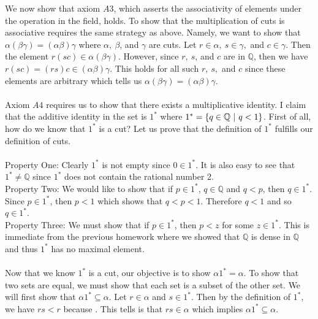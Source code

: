 \documentclass[12pt]{article}
\begin{document}
We now show that axiom $A3$, which asserts the associativity of elements under the operation in the field, holds. To show that the multiplication of cuts is associative requires the same strategy as above. Namely, we want to show that $\alpha (\beta \gamma) = (\alpha \beta)  \gamma$ where $\alpha, ~\beta$, and $\gamma$ are cuts. Let $r \in \alpha,~ s \in \gamma,$ and $c \in \gamma$. Then the element $r(sc) \in \alpha (\beta \gamma)$. However, since $r,~ s$, and $c$ are in $\mathbb{Q}$, then we have $r(sc)=(rs)c \in (\alpha \beta) \gamma$. This holds for all such $r,~s,$ and $c$ since these elements are arbitrary which tells us $\alpha (\beta \gamma) = (\alpha \beta) \gamma$. \\  \\

Axiom $A4$ requires us to show that there exists a multiplicative identity. I claim that the additive identity in the set is $1^{*}$ where $1^{*}= \left\{q \in \mathbb{Q}~|~q<1\right\}$. First of all, how do we know that $1^{*}$ is a cut? Let us prove that the definition of $1^{*}$ fulfills our definition of cuts. \\ \\

Property One: Clearly $1^{*}$ is not empty since $0 \in 1^{*}$. It is also easy to see that $1^{*} \neq \mathbb{Q}$ since $1^{*}$ does not contain the rational number 2. \\ 

Property Two: We would like to show that if $p \in 1^{*}$, $q \in \mathbb{Q}$ and $q<p$, then $q \in 1^{*}$. Since $p \in 1^{*}$, then $p<1$ which shows that $q<p<1$. Therefore $q<1$ and so $q \in 1^{*}$. \\

Property Three: We must show that if $p \in 1^{*}$, then $p<z$ for some $z \in  1^{*}$. This is immediate from the previous homework where we showed that $\mathbb{Q}$ is dense in $\mathbb{Q}$ and thus $1^{*}$ has no maximal element.\\ \\

Now that we know  $1^{*}$ is a cut, our objective is to show $\alpha 1^{*} = \alpha$. To show that two sets are equal, we must show that each set is a subset of the other set. We will first show that $\alpha 1^{*} \subseteq \alpha$. Let $r \in \alpha$ and $s \in 1^{*}$. Then by the definition of $1^{*}$, we have $rs<r$ because . This tells is that $rs \in \alpha$ which implies $\alpha 1^{*}  \subseteq \alpha$. \\ 
\end{document}

